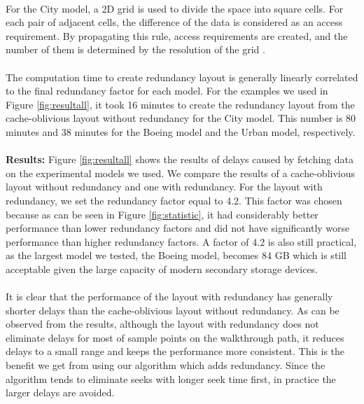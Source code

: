 \\
For the City model, a 2D grid is used to divide the space into square cells.
For each pair of adjacent cells, the difference of the data is considered as an
access requirement. By propagating this rule, access requirements are created,
and the number of them is determined by the resolution of the grid
\cite{singleseeklayout}.\\
\\
The computation time to create redundancy layout is generally linearly correlated to the final redundancy factor for each model. For the examples we used in Figure \ref{fig:resultall}, it took 16 minutes to create the redundancy layout from the cache-oblivious layout without redundancy for the City model. This number is 80 minutes and 38 minutes for the Boeing model and the Urban model, respectively. \\
\\
\textbf{Results:}
Figure \ref{fig:resultall} shows the results of delays caused by fetching data on the experimental models we used. We compare the results of a cache-oblivious layout without redundancy and one with redundancy. For the layout with redundancy, we set the redundancy factor equal to 4.2. This factor was chosen because as can be seen in Figure \ref{fig:statistic}, it had considerably better performance than lower redundancy factors and did not have significantly worse performance than higher redundancy factors. A factor of 4.2 is also still practical, as the largest model we tested, the Boeing model, becomes 84 GB which is still acceptable given the large capacity of modern secondary storage devices.\\
\\
It is clear that the performance of the layout with redundancy has generally shorter delays than the cache-oblivious layout without redundancy. As can be observed from the results, although the layout with redundancy does not eliminate delays for most of sample points on the walkthrough path, it reduces delays to a small range and keeps the performance more consistent. This is the benefit we get from using our algorithm which adds redundancy. Since the algorithm tends to eliminate seeks with longer seek time first, in practice the larger delays are avoided.
